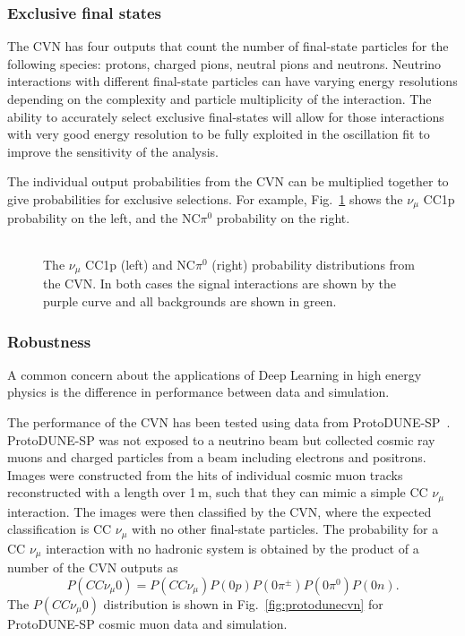 \subsubsection{Exclusive final states}
The CVN has four outputs that count the number of final-state particles for the following species: protons, charged pions, neutral pions and neutrons. Neutrino interactions with different final-state particles can have varying energy resolutions depending on the complexity and particle multiplicity of the interaction. The ability to accurately select exclusive final-states will allow for those interactions with very good energy resolution to be fully exploited in the oscillation fit to improve the sensitivity of the analysis.

The individual output probabilities from the CVN can be multiplied together to give probabilities for exclusive selections. For example, Fig.~\ref{fig:exclusive} shows the $\nu_\mu$ CC1p probability on the left, and the NC$\pi^0$ probability on the right.
\begin{figure}
    \centering
    \begin{tabular}{cc}
	\end{tabular}
	\caption{The $\nu_\mu$ CC1p (left) and NC$\pi^0$ (right) probability distributions from the CVN. In both cases the signal interactions are shown by the purple curve and all backgrounds are shown in green.}
    \label{fig:exclusive}
\end{figure}

\subsubsection{Robustness}
A common concern about the applications of Deep Learning in high energy physics is the difference in performance between data and simulation.

The performance of the CVN has been tested using data from ProtoDUNE-SP~\cite{Abi:2017aow}. ProtoDUNE-SP was not exposed to a neutrino beam but collected cosmic ray muons and charged particles from a beam including electrons and positrons. Images were constructed from the hits of individual cosmic muon tracks reconstructed with a length over 1\,m, such that they can mimic a simple CC $\nu_\mu$ interaction. The images were then classified by the CVN, where the expected classification is CC $\nu_\mu$ with no other final-state particles. The probability for a CC $\nu_\mu$ interaction with no hadronic system is obtained by the product of a number of the CVN outputs as
\begin{equation}
P(CC\nu_\mu0) = P(CC\nu_\mu)P(0p)P(0\pi^\pm)P(0\pi^0)P(0n).    
\end{equation} 
The $P(CC\nu_\mu0)$ distribution is shown in Fig.~\ref{fig:protodunecvn} for ProtoDUNE-SP cosmic muon data and simulation.

